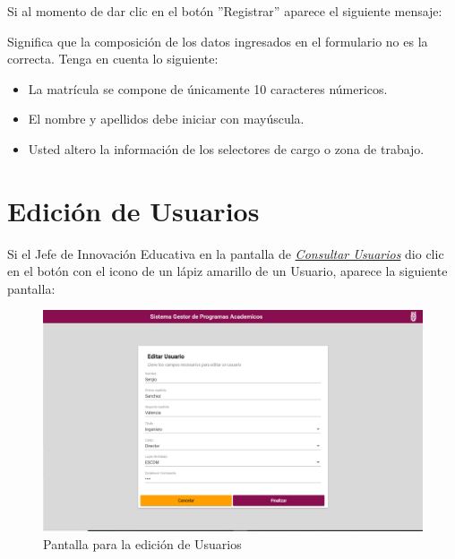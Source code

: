 \begin{itemize}
                        Si al momento de dar clic en el botón ''Registrar'' aparece el siguiente mensaje:
                    
                        Significa que la composición de los datos ingresados en el formulario no es la correcta. Tenga en cuenta lo siguiente:
                    
                        \begin{itemize}
                            \item La matrícula se compone de únicamente 10 caracteres númericos.
                            \item El nombre y apellidos debe iniciar con mayúscula.
                            \item Usted altero la información de los selectores de cargo o zona de trabajo.
                        \end{itemize}
                    
                \end{itemize}

\newpage

            \section{Edición de Usuarios} 
                Si el Jefe de Innovación Educativa en la pantalla de \hyperlink{consultarUs}{\textit{Consultar Usuarios}} dio clic en el botón con el icono de un lápiz amarillo de un Usuario, aparece la siguiente pantalla:
                
                \begin{figure}[!hbtp]
                    \centering
                    \hypertarget{editarUs}{\includegraphics[width=0.7\linewidth]{images/SP5/Editar-Usuario}}
                    \caption{Pantalla para la edición de Usuarios}
                    \label{editarrh}
                \end{figure}
                
